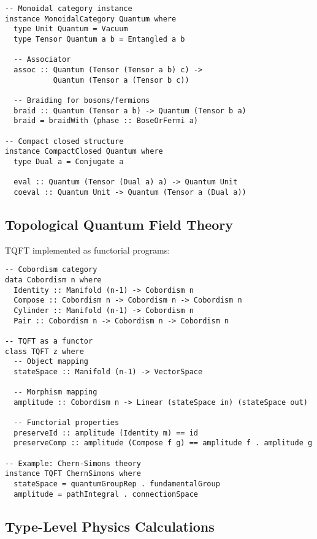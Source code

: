 \begin{example}
\begin{verbatim}
-- Monoidal category instance
instance MonoidalCategory Quantum where
  type Unit Quantum = Vacuum
  type Tensor Quantum a b = Entangled a b
  
  -- Associator
  assoc :: Quantum (Tensor (Tensor a b) c) ->
           Quantum (Tensor a (Tensor b c))
  
  -- Braiding for bosons/fermions
  braid :: Quantum (Tensor a b) -> Quantum (Tensor b a)
  braid = braidWith (phase :: BoseOrFermi a)
  
-- Compact closed structure
instance CompactClosed Quantum where
  type Dual a = Conjugate a
  
  eval :: Quantum (Tensor (Dual a) a) -> Quantum Unit
  coeval :: Quantum Unit -> Quantum (Tensor a (Dual a))
\end{verbatim}
\end{example}

\subsection{Topological Quantum Field Theory}

TQFT implemented as functorial programs:

\begin{example}
\begin{verbatim}
-- Cobordism category
data Cobordism n where
  Identity :: Manifold (n-1) -> Cobordism n
  Compose :: Cobordism n -> Cobordism n -> Cobordism n
  Cylinder :: Manifold (n-1) -> Cobordism n
  Pair :: Cobordism n -> Cobordism n -> Cobordism n

-- TQFT as a functor
class TQFT z where
  -- Object mapping
  stateSpace :: Manifold (n-1) -> VectorSpace
  
  -- Morphism mapping  
  amplitude :: Cobordism n -> Linear (stateSpace in) (stateSpace out)
  
  -- Functorial properties
  preserveId :: amplitude (Identity m) == id
  preserveComp :: amplitude (Compose f g) == amplitude f . amplitude g
  
-- Example: Chern-Simons theory
instance TQFT ChernSimons where
  stateSpace = quantumGroupRep . fundamentalGroup
  amplitude = pathIntegral . connectionSpace
\end{verbatim}
\end{example}

\subsection{Type-Level Physics Calculations}

